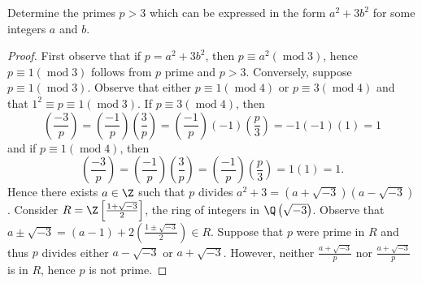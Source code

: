 \documentclass[10pt]{amsart}
\begin{document}
\begin{ex3}
  Determine the primes $p > 3$ which can be expressed in the form $a^2 + 3b^2$ for some integers $a$ and $b$.
  
  \begin{proof}
    First observe that if $p = a^2 + 3b^2$, then $p \equiv a^2 (\operatorname{mod} 3)$, hence $p \equiv 1 (\operatorname{mod} 3)$ follows from $p$ prime and $p > 3$.
    Conversely, suppose $p \equiv 1 (\operatorname{mod} 3)$.
    Observe that either $p \equiv 1 (\operatorname{mod} 4)$ or $p \equiv 3 (\operatorname{mod} 4)$ and that $1^2 \equiv p \equiv 1 (\operatorname{mod} 3)$.
    If $p \equiv 3 (\operatorname{mod} 4)$, then $$\left(\frac{-3}{p}\right) = \left(\frac{-1}{p}\right)\left(\frac{3}{p}\right) = \left(\frac{-1}{p}\right)(-1)\left(\frac{p}{3}\right) = -1(-1)(1) = 1$$
    and if $p \equiv 1 (\operatorname{mod} 4)$, then $$\left(\frac{-3}{p}\right) = \left(\frac{-1}{p}\right)\left(\frac{3}{p}\right) = \left(\frac{-1}{p}\right)\left(\frac{p}{3}\right) = 1(1) = 1.$$
    Hence there exists $a \in \Z$ such that $p$ divides $a^2 + 3 = (a + \sqrt{-3})(a - \sqrt{-3})$.
    Consider $R = \Z\left[\frac{1 + \sqrt{-3}}{2}\right]$, the ring of integers in $\Q\left(\sqrt{-3}\right)$.
    Observe that $a \pm \sqrt{-3} = (a - 1) + 2\left(\frac{1 \pm \sqrt{-3}}{2}\right) \in R$.
    Suppose that $p$ were prime in $R$ and thus $p$ divides either $a - \sqrt{-3}$ or $a + \sqrt{-3}$.
    However, neither $\frac{a + \sqrt{-3}}{p}$ nor $\frac{a + \sqrt{-3}}{p}$ is in $R$, hence $p$ is not prime.
    

\end{proof}
\end{ex3}
\end{document}
